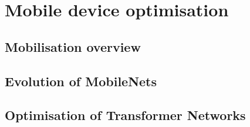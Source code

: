 \section{Mobile device optimisation}
\label{sec:Mobile device optimisation}
\subsection{Mobilisation overview}
\citet{deng2019deep}

\citet{chen2020deep}

\subsection{Evolution of MobileNets}
\citet{howard2017mobilenets}

\citet{sandler2018mobilenetv2}

\citet{howard2019searching}

\citet{tan2020efficientnet}

\citet{tan2021efficientnetv2}

\subsection{Optimisation of Transformer Networks}
\citet{wu2020lite}

\citet{mehta2020delight}

\citet{beltagy2020longformer}